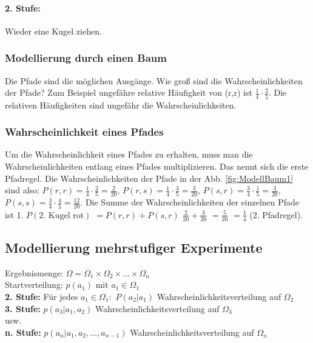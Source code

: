 \paragraph{2. Stufe:} Wieder eine Kugel ziehen. 

\subsubsection{Modellierung durch einen Baum}
Die Pfade sind die möglichen Ausgänge. Wie groß sind die Wahrscheinlichkeiten der Pfade? Zum Beispiel ungefähre relative Häufigkeit von (r,r) ist $\frac{1}{4} \cdot \frac{2}{5} $. Die relativen Häufigkeiten sind ungefähr die Wahrscheinlichkeiten. 

\subsubsection{Wahrscheinlichkeit eines Pfades}
Um die Wahrscheinlichkeit eines Pfades zu erhalten, muss man die Wahrscheinlichkeiten entlang eines Pfades multiplizieren. Das nennt sich die erste Pfadregel. Die Wahrscheinlichkeiten der Pfade in der Abb. \ref{fig:ModellBaum1} sind also: 
$P(r,r) = \frac{1}{4} \cdot \frac{2}{5} = \frac{2}{20}$, 
$P(r,s) = \frac{1}{4} \cdot \frac{3}{5} = \frac{3}{20}$, 
$P(s,r) = \frac{3}{4} \cdot \frac{1}{5} = \frac{3}{20}$, 
$P(s,s) = \frac{3}{4} \cdot \frac{4}{5} = \frac{12}{20}$. Die Summe der Wahrscheinlichkeiten der einzelnen Pfade ist 1.
$P(\textrm{2. Kugel rot}) $
$= P(r,r) + P(s,r)$
$\frac{2}{20} + \frac{3}{20} $
$=\frac{5}{20}$
$=\frac{1}{4}$ (2. Pfadregel).

\subsection{Modellierung mehrstufiger Experimente}
Ergebnismenge: $\Omega = \Omega_1 \times \Omega_2 \times ... \times \Omega_n$\\
Startverteilung: $p(a_1)$ mit $a_1 \in \Omega_1$\\
\textbf{2. Stufe:} Für jedes $a_1 \in \Omega_1:$ $P(a_2 | a_1)$ Wahrscheinlichkeitsverteilung auf $\Omega_2$\\
\textbf{3. Stufe:} $p(a_3 | a_1, a_2)$ Wahrscheinlichkeitsverteilung auf $\Omega_3$\\
usw.\\
\textbf{n. Stufe:} $p(a_n | a_1, a_2, ..., a_{n-1})$ Wahrscheinlichkeitsverteilung auf $\Omega_n$\\

